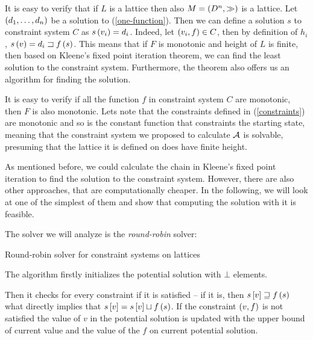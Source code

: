 \documentclass[..thesis.tex]{subfiles}
\begin{document}
It is easy to verify that if $L$ is a lattice then also $M = \left( D^n, \gg \right)$ is a lattice. Let $\left( d_1, \ldots, d_n \right) $ be a solution to (\ref{one-function}). Then we can define a solution $s$ to constraint system $C$ as $s \left( v_i \right) = d_i$. Indeed, let $ \left( v_i, f \right) \in C$, then by definition of $h_i$, $s \left( v \right) = d_i \sqsupset f \left( s \right)$. This means that if $F$ is monotonic and height of $L$ is finite, then based on Kleene's fixed point iteration theorem, we can find the least solution to the constraint system. Furthermore, the theorem also offers us an algorithm for finding the solution.

It is easy to verify if all the function $f$ in constraint system $C$ are monotonic, then $F$ is also monotonic. Lets note that the constraints defined in (\ref{constraints}) are monotonic and so is the constant function that constraints the starting state, meaning that the constraint system we proposed to calculate $\mathcal{A}$ is solvable, presuming that the lattice it is defined on does have finite height.


As mentioned before, we could calculate the chain in Kleene's fixed point iteration to find the solution to the constraint system. However, there are also other approaches, that are computationally cheaper. In the following, we will look at one of the simplest of them and show that computing the solution with it is feasible.

The solver we will analyze is the \textit{round-robin} solver:


\begin{algorithm}[H]
\label{round-robin}
\caption{Round-robin solver for constraint systems on lattices}
\end{algorithm}
The algorithm firstly initializes the potential solution with $\bot$ elements.

Then it checks for every constraint if it is satisfied -- if it is, then $s \left[ v \right] \sqsupseteq f \left( s \right)$ what directly implies that $s \left[ v \right] = s \left[ v \right] \sqcup f \left( s \right)$. If the constraint $\left( v, f \right)$  is not satisfied the value of $v$ in the potential solution is updated with the upper bound of current value and the value of the $f$ on current potential solution.
\end{document}
